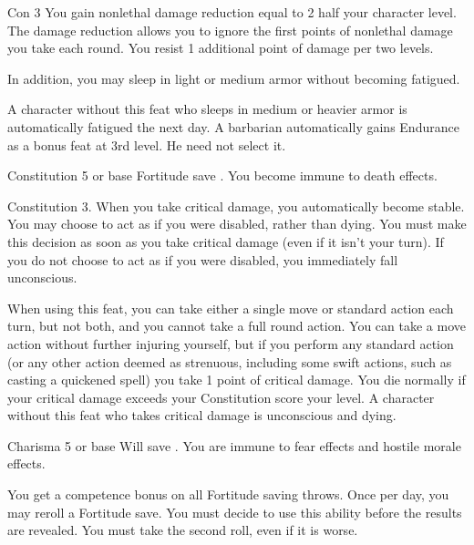 \featpre Con 3
 You gain nonlethal damage reduction equal to 2 \add half your character level. The damage reduction allows you to ignore the first points of nonlethal damage you take each round. You resist 1 additional point of damage per two levels.

In addition, you may sleep in light or medium armor without becoming fatigued.

 A character without this feat who sleeps in medium or heavier armor is automatically fatigued the next day.
 A barbarian automatically gains Endurance as a bonus feat at 3rd level. He need not select it.

\featpre Constitution 5 or base Fortitude save .
\featben You become immune to death effects.

 Constitution 3.
 When you take critical damage, you automatically become stable. You may choose to act as if you were disabled, rather than dying. You must make this decision as soon as you take critical damage (even if it isn't your turn). If you do not choose to act as if you were disabled, you immediately fall unconscious.
\par When using this feat, you can take either a single move or standard action each turn, but not both, and you cannot take a full round action. You can take a move action without further injuring yourself, but if you perform any standard action (or any other action deemed as strenuous, including some swift actions, such as casting a quickened spell) you take 1 point of critical damage. You die normally if your critical damage exceeds your Constitution score \add your level.
 A character without this feat who takes critical damage is unconscious and dying.

\featpre Charisma 5 or base Will save .
\featben You are immune to fear effects and hostile morale effects.

 You get a  competence bonus on all Fortitude saving throws. Once per day, you may reroll a Fortitude save. You must decide to use this ability before the results are revealed. You must take the second roll, even if it is worse.


